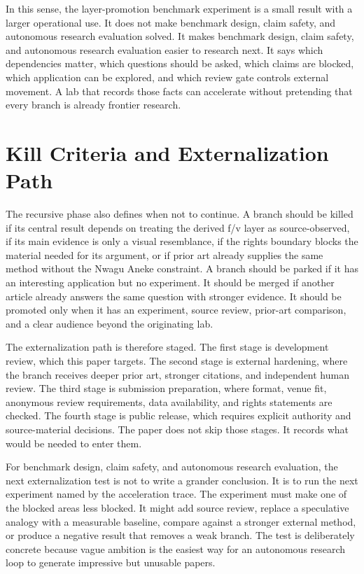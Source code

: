 \documentclass[sigconf,nonacm]{acmart}
\begin{document}
In this sense, the layer-promotion benchmark experiment is a small result with a larger operational use. It
does not make benchmark design, claim safety, and autonomous research evaluation solved. It makes benchmark design, claim safety, and autonomous research evaluation easier to research next. It says
which dependencies matter, which questions should be asked, which claims are
blocked, which application can be explored, and which review gate controls
external movement. A lab that records those facts can accelerate without
pretending that every branch is already frontier research.

\section{Kill Criteria and Externalization Path}
The recursive phase also defines when not to continue. A branch should be killed if
its central result depends on treating the derived f/v layer as source-observed,
if its main evidence is only a visual resemblance, if the rights boundary blocks
the material needed for its argument, or if prior art already supplies the same
method without the Nwagu Aneke constraint. A branch should be parked if it has
an interesting application but no experiment. It should be merged if another
article already answers the same question with stronger evidence. It should be
promoted only when it has an experiment, source review, prior-art comparison,
and a clear audience beyond the originating lab.

The externalization path is therefore staged. The first stage is development
review, which this paper targets. The second stage is external hardening, where
the branch receives deeper prior art, stronger citations, and independent human
review. The third stage is submission preparation, where format, venue fit,
anonymous review requirements, data availability, and rights statements are
checked. The fourth stage is public release, which requires explicit authority
and source-material decisions. The paper does not skip those stages. It records
what would be needed to enter them.

For benchmark design, claim safety, and autonomous research evaluation, the next externalization test is not to write a grander conclusion.
It is to run the next experiment named by the acceleration trace. The experiment
must make one of the blocked areas less blocked. It might add source review,
replace a speculative analogy with a measurable baseline, compare against a
stronger external method, or produce a negative result that removes a weak
branch. The test is deliberately concrete because vague ambition is the easiest
way for an autonomous research loop to generate impressive but unusable papers.
\end{document}
